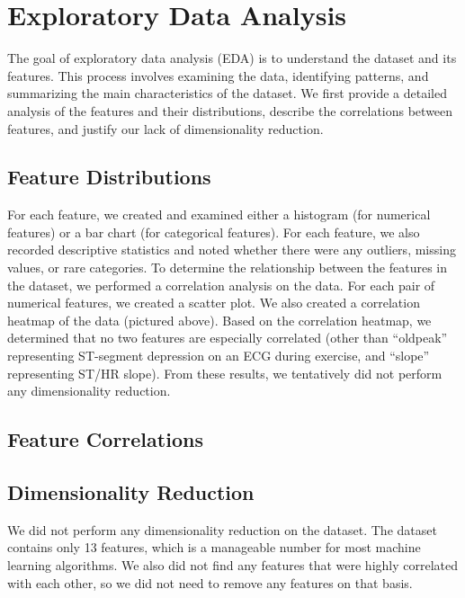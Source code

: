 \section{Exploratory Data Analysis}

The goal of exploratory data analysis (EDA) is to understand the dataset and its features. This process involves examining the data, identifying patterns, and summarizing the main characteristics of the dataset. We first provide a detailed analysis of the features and their distributions, describe the correlations between features, and justify our lack of dimensionality reduction.

\subsection{Feature Distributions}
For each feature, we created and examined either a histogram (for numerical features) or a bar chart (for categorical features). For each feature, we also recorded descriptive statistics and noted whether there were any outliers, missing values, or rare categories. To determine the relationship between the features in the dataset, we performed a correlation analysis on the data. For each pair of numerical features, we created a scatter plot. We also created a correlation heatmap of the data (pictured above). Based on the correlation heatmap, we determined that no two features are especially correlated (other than ``oldpeak'' representing ST-segment depression on an ECG during exercise, and ``slope'' representing ST/HR slope). From these results, we tentatively did not perform any dimensionality reduction.

\subsection{Feature Correlations}

\subsection{Dimensionality Reduction}
We did not perform any dimensionality reduction on the dataset. The dataset contains only 13 features, which is a manageable number for most machine learning algorithms. We also did not find any features that were highly correlated with each other, so we did not need to remove any features on that basis.